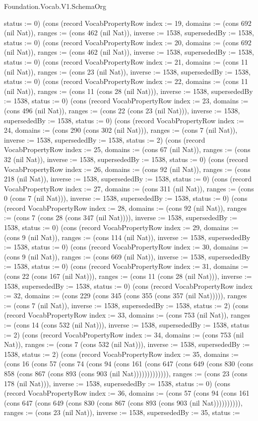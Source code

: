 \begin{lexlean}{Foundation.Vocab.V1.SchemaOrg}
\begin{semanticmodule}
{status := 0}) (cons (record VocabPropertyRow {index := 19, domains := (cons 692 (nil Nat)), ranges := (cons 462 (nil Nat)), inverse := 1538, supersededBy := 1538, status := 0}) (cons (record VocabPropertyRow {index := 20, domains := (cons 692 (nil Nat)), ranges := (cons 462 (nil Nat)), inverse := 1538, supersededBy := 1538, status := 0}) (cons (record VocabPropertyRow {index := 21, domains := (cons 11 (nil Nat)), ranges := (cons 23 (nil Nat)), inverse := 1538, supersededBy := 1538, status := 0}) (cons (record VocabPropertyRow {index := 22, domains := (cons 11 (nil Nat)), ranges := (cons 11 (cons 28 (nil Nat))), inverse := 1538, supersededBy := 1538, status := 0}) (cons (record VocabPropertyRow {index := 23, domains := (cons 496 (nil Nat)), ranges := (cons 22 (cons 23 (nil Nat))), inverse := 1538, supersededBy := 1538, status := 0}) (cons (record VocabPropertyRow {index := 24, domains := (cons 290 (cons 302 (nil Nat))), ranges := (cons 7 (nil Nat)), inverse := 1538, supersededBy := 1538, status := 2}) (cons (record VocabPropertyRow {index := 25, domains := (cons 67 (nil Nat)), ranges := (cons 32 (nil Nat)), inverse := 1538, supersededBy := 1538, status := 0}) (cons (record VocabPropertyRow {index := 26, domains := (cons 92 (nil Nat)), ranges := (cons 218 (nil Nat)), inverse := 1538, supersededBy := 1538, status := 0}) (cons (record VocabPropertyRow {index := 27, domains := (cons 311 (nil Nat)), ranges := (cons 0 (cons 7 (nil Nat))), inverse := 1538, supersededBy := 1538, status := 0}) (cons (record VocabPropertyRow {index := 28, domains := (cons 92 (nil Nat)), ranges := (cons 7 (cons 28 (cons 347 (nil Nat)))), inverse := 1538, supersededBy := 1538, status := 0}) (cons (record VocabPropertyRow {index := 29, domains := (cons 9 (nil Nat)), ranges := (cons 114 (nil Nat)), inverse := 1538, supersededBy := 1538, status := 0}) (cons (record VocabPropertyRow {index := 30, domains := (cons 9 (nil Nat)), ranges := (cons 669 (nil Nat)), inverse := 1538, supersededBy := 1538, status := 0}) (cons (record VocabPropertyRow {index := 31, domains := (cons 22 (cons 167 (nil Nat))), ranges := (cons 11 (cons 28 (nil Nat))), inverse := 1538, supersededBy := 1538, status := 0}) (cons (record VocabPropertyRow {index := 32, domains := (cons 229 (cons 345 (cons 355 (cons 357 (nil Nat))))), ranges := (cons 7 (nil Nat)), inverse := 1538, supersededBy := 1538, status := 2}) (cons (record VocabPropertyRow {index := 33, domains := (cons 753 (nil Nat)), ranges := (cons 14 (cons 532 (nil Nat))), inverse := 1538, supersededBy := 1538, status := 2}) (cons (record VocabPropertyRow {index := 34, domains := (cons 753 (nil Nat)), ranges := (cons 7 (cons 532 (nil Nat))), inverse := 1538, supersededBy := 1538, status := 2}) (cons (record VocabPropertyRow {index := 35, domains := (cons 16 (cons 57 (cons 74 (cons 94 (cons 161 (cons 647 (cons 649 (cons 830 (cons 858 (cons 867 (cons 893 (cons 903 (nil Nat))))))))))))), ranges := (cons 23 (cons 178 (nil Nat))), inverse := 1538, supersededBy := 1538, status := 0}) (cons (record VocabPropertyRow {index := 36, domains := (cons 57 (cons 94 (cons 161 (cons 647 (cons 649 (cons 830 (cons 867 (cons 893 (cons 903 (nil Nat)))))))))), ranges := (cons 23 (nil Nat)), inverse := 1538, supersededBy := 35, status := }
\end{semanticmodule}
\end{lexlean}
